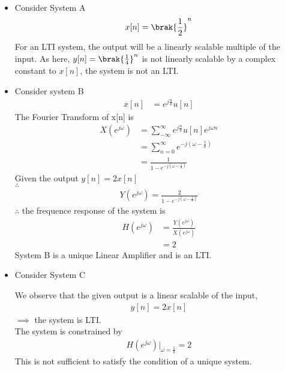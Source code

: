 \documentclass[journal,12pt,twocolumn]{IEEEtran}
\begin{document}
\solution \\
\begin{itemize}
    \item Consider System A
    \begin{align}
        x[n] = \brak{\frac{1}{2}}^n
    \end{align}
    For an LTI system, the output will be a linearly scalable multiple of the input. As here, $y[n] = \brak{\frac{1}{4}}^n $ is not linearly scalable by a complex constant to $x[n]$, the system is not an LTI.
    
    \item Consider system B
    \begin{align}
        x[n] &= e^{j\frac{n}{8}}u[n]
    \end{align}
        The Fourier Transform of x[n] is
\begin{align}
        X(e^{j\omega}) &= \sum_{-\infty}^{\infty} e^{j\frac{n}{8}}u[n]e^{j\omega n} \\
        &= \sum_{n=0}^{\infty}e^{-j(\omega - \frac{1}{8})}   \\
        &= \frac{1}{1 - e^{-j(\omega - \frac{1}{8})}}
\end{align}
Given the output $y[n] = 2x[n]$ \\
$\therefore$ 
\begin{align}
    Y(e^{j\omega}) = \frac{2}{1 - e^{-j(\omega - \frac{1}{8})}}
\end{align}
$\therefore$ the frequence response of the system is 
\begin{align}
    H(e^{j\omega}) &= \frac{Y(e^{j\omega})}{X(e^{j\omega})} \\ &= 2
\end{align}
System B is a unique Linear Amplifier and is an LTI.

\item Consider System C

We observe that the given output is a linear scalable of the input, 
\begin{align}
    y[n] = 2 x[n]
\end{align}
$\implies$ the system is LTI.\\
The system is constrained by 
\begin{align}
    H(e^{j\omega})|_{\omega = \frac{1}{8}} = 2
\end{align}
This is not sufficient to satisfy the condition of a unique system.
\end{itemize}
\end{document}
